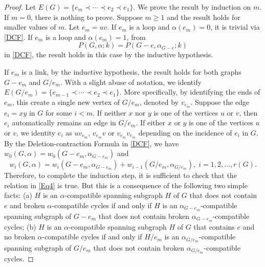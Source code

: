 \documentclass[12pt]{article}%
\numberwithin{equation}{section}
\begin{document}
\begin{proof}
Let $E(G)=\{e_m\prec\cdots\prec e_2\prec e_1\}$. We prove the result by induction on $m$. If $m=0$,  there is nothing to prove. Suppose $m\ge 1$ and the result holds for smaller values of $m$. Let $e_m=uv$. If $e_m$ is a loop and $\alpha(e_m)=0$, it is trivial via \autoref{DCF}. If $e_m$ is a loop and $\alpha(e_m)=1$, from 
\[
P(G,\alpha;k)=P(G-e, \alpha_{G-e};k)
\]
in \autoref{DCF}, the result holds in this case by the inductive hypothesis. 

If $e_m$ is a link, by the inductive hypothesis, the result holds for both graphs $G-e_m$ and $G/e_m$. With a slight abuse of notation, we identify $E(G/e_m)=\{e_{m-1}\prec\cdots\prec e_2\prec e_1\}$. More specifically, by identifying the ends of $e_m$, this create a single new vertex of $G/e_m$, denoted by $v_{e_m}$. Suppose the edge $e_i=xy$ in $G$ for some $i<m$. If neither $x$ nor $y$ is one of the vertices $u$ or $v$, then $e_i$  automatically remains an edge in $G/e_m$.  If either $x$ or $y$ is one of the vertices $u$ or $v$, we identity $e_i$ as $uv_{e_m}$, $v_{e_m}v$ or $v_{e_m}v_{e_m}$ depending on the incidence of $e_i$ in $G$. By the Deletion-contraction Formula in \autoref{DCF}, we have $w_0(G,\alpha)=w_0(G-e_m,\alpha_{G-e_m})$ and
\begin{equation}\label{Eq4}
w_i(G,\alpha)=w_i(G-e_m,\alpha_{G-e_m})+w_{i-1}(G/e_m,\alpha_{G/e_m}),\; i=1,2,\ldots,r(G).
\end{equation}
Therefore, to complete the induction step, it is sufficient to check that the relation in \eqref{Eq4} is true. But this is a consequence of the following two simple facts: (a) $H$ is an $\alpha$-compatible spanning subgraph $H$ of $G$ that does not contain $e$ and broken $\alpha$-compatible cycles  if and only if $H$ is an $\alpha_{G-e_m}$-compatible spanning subgraph of $G-e_m$ that does not contain   broken $\alpha_{G-e_m}$-compatible  cycles; (b) $H$ is an $\alpha$-compatible spanning subgraph $H$ of $G$ that contains $e$ and no  broken $\alpha$-compatible cycles  if and only if $H/e_m$ is an $\alpha_{G/e_m}$-compatible spanning subgraph of $G/e_m$ that does not contain   broken $\alpha_{G/e_m}$-compatible cycles. 
\end{proof}
\end{document}
